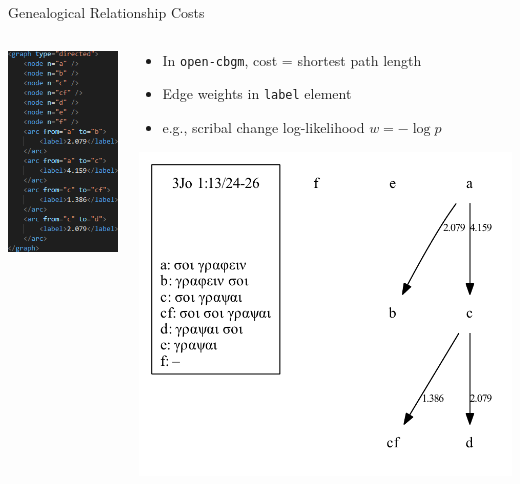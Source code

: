 \documentclass[10pt]{beamer}
\begin{document}
	\begin{frame}{Genealogical Relationship Costs}
		\begin{columns}
			\begin{column}{0.4\textwidth}
				\includegraphics[scale=0.6667]{../graphics/B25K1V13U24-26-local-stemma-weighted-xml.png}
			\end{column}
			\begin{column}{0.55\textwidth}
				\begin{itemize}
					\item In \texttt{open-cbgm}, cost = shortest path length
					\item Edge weights in \texttt{label} element 
					\item e.g., scribal change log-likelihood $w = -\log p$
				\end{itemize}
				\includegraphics[width=\textwidth]{../graphics/B25K1V13U24-26-local-stemma-weighted.pdf}
			\end{column}
		\end{columns}
	\end{frame}
\end{document}
